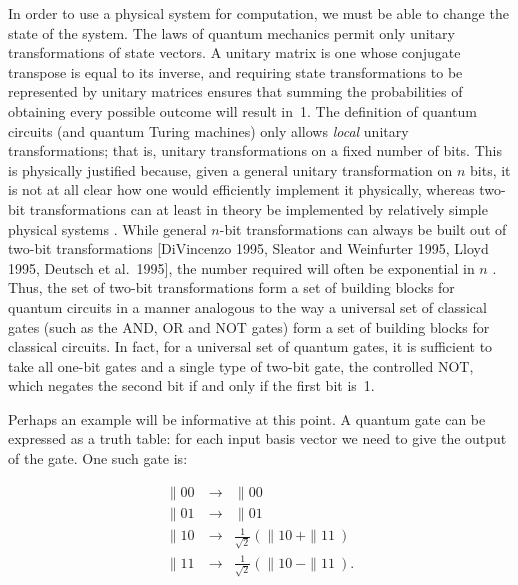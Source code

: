 In order to use a physical
system for computation, we must be able to change the state of the system.
The laws of quantum mechanics permit only unitary transformations of 
state vectors.  A unitary matrix is one whose conjugate transpose is 
equal to its inverse, and requiring state transformations to be represented 
by unitary matrices ensures that summing the probabilities
of obtaining every possible outcome will result in~1.
The definition of quantum circuits (and quantum Turing machines) only
allows {\em local} unitary transformations; that is, unitary transformations
on a fixed number of bits.  
This is physically justified because, 
given a general unitary transformation on $n$ bits, it is
not at all clear how one would efficiently implement it physically, whereas 
two-bit transformations can at least in theory be implemented by relatively 
simple physical systems \cite{CiZo,DiVi,SlWe,ChYa}.  While general $n$-bit
transformations can always be built out of two-bit transformations
[DiVincenzo 1995, Sleator and Weinfurter 1995, Lloyd 1995, Deutsch et al.\ 
1995], the number required will often be 
exponential in $n$ \cite{nine}.   Thus, the set of two-bit transformations 
form a set of building blocks for quantum circuits in a manner analogous 
to the way a universal set of classical gates (such as the
AND, OR and NOT gates) form a set of building blocks for classical circuits. 
In fact, for a universal set of quantum gates, it is sufficient to take
all one-bit gates and a single type of two-bit gate, the controlled NOT,
which negates the second bit if and only if the first bit is~1.

Perhaps an example will be informative at this point.  A quantum gate
can be expressed as a truth table: for each input basis vector we need
to give the output of the gate.  One such gate is:\\
\noindent
\begin{minipage}{\textwidth} %
\begin{eqnarray}
\|00\> &\rightarrow& \|00\> \nonumber \\
\|01\> &\rightarrow& \|01\> \label{exampletrtable} \\
\|10\> &\rightarrow& 
{\textstyle \frac{1}{\sqrt{2}}} (\|10\> + \|11\>) \nonumber \\
\|11\> &\rightarrow& 
{\textstyle \frac{1}{\sqrt{2}}} (\|10\> - \|11\>). \nonumber
\end{eqnarray}
\end{minipage}

